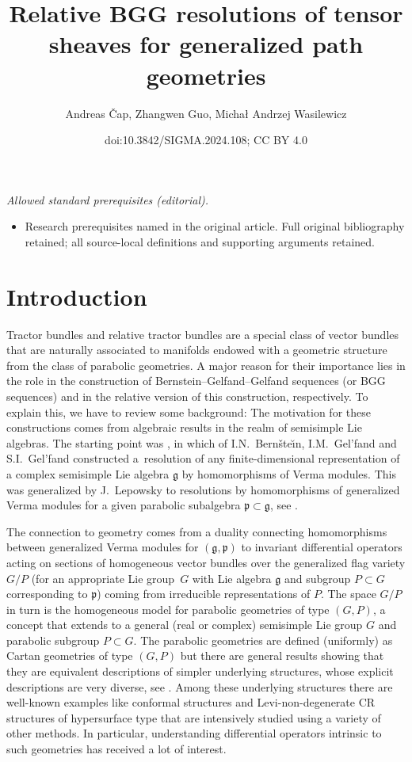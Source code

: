 \documentclass[10pt,a4paper]{amsart}
\title{Relative BGG resolutions of tensor sheaves for generalized path geometries}
\author{Andreas Čap, Zhangwen Guo, Michał Andrzej Wasilewicz}
\date{doi:10.3842/SIGMA.2024.108; CC BY 4.0}
\numberwithin{equation}{section}
\def\frak{\mathfrak}
\begin{document}
\maketitle
\noindent\textit{Allowed standard prerequisites (editorial).}\begin{itemize}
\item Research prerequisites named in the original article. Full original bibliography retained; all source-local definitions and supporting arguments retained.
\end{itemize}\medskip
\section{Introduction}\label{1}
Tractor bundles and relative tractor bundles are a special class of vector bundles
that are naturally associated to manifolds endowed with a geometric structure from
the class of parabolic geometries. A major reason for their importance lies in the
role in the construction of Bernstein--Gelfand--Gelfand sequences (or BGG sequences)
and in the relative version of this construction, respectively. To explain this, we
have to review some background: The motivation for these constructions comes from
algebraic results in the realm of semisimple Lie algebras. The starting point was
\cite{BGG}, in which of I.N.~Bern{\v{s}}te{\u\i}n, I.M.~Gel'fand and S.I.~Gel'fand constructed a~resolution of any finite-dimensional
representation of a complex semisimple Lie algebra $\frak g$ by homomorphisms of
Verma modules. This was generalized by J.~Lepowsky to resolutions by homomorphisms of
generalized Verma modules for a given parabolic subalgebra $\frak p\subset\frak g$,
see \cite{Lepowsky}.

The connection to geometry comes from a duality connecting homomorphisms between
generalized Verma modules for $(\frak g,\frak p)$ to invariant differential operators
acting on sections of homogeneous vector bundles over the generalized flag variety
$G/P$ (for an appropriate Lie group~$G$ with Lie algebra $\frak g$ and subgroup
$P\subset G$ corresponding to $\frak p$) coming from irreducible representations of
$P$. The space $G/P$ in turn is the homogeneous model for parabolic geometries of
type $(G,P)$, a concept that extends to a general (real or complex) semisimple Lie
group $G$ and parabolic subgroup $P\subset G$. The parabolic geometries are defined
(uniformly) as Cartan geometries of type $(G,P)$ but there are general results
showing that they are equivalent descriptions of simpler underlying structures,
whose explicit descriptions are very diverse, see \cite{book}. Among these underlying
structures there are well-known examples like conformal structures and
Levi-non-degenerate CR structures of hypersurface type that are intensively studied
using a variety of other methods. In particular, understanding differential operators
intrinsic to such geometries has received a lot of interest.
\end{document}
